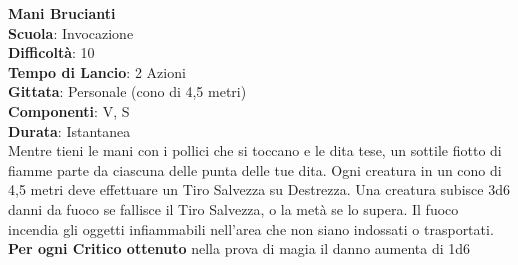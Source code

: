 \begin{multicols}{2}
\medskip\textbf{Mani Brucianti}\\
\textbf{Scuola}: Invocazione\\
\textbf{Difficoltà}:  10\\
\textbf{Tempo di Lancio}: 2 Azioni\\
\textbf{Gittata}: Personale (cono di 4,5 metri)\\
\textbf{Componenti}: V, S\\
\textbf{Durata}: Istantanea\\
Mentre tieni le mani con i pollici che si toccano e le dita tese, un sottile fiotto di fiamme parte da ciascuna delle punta delle tue dita. Ogni creatura in un cono di 4,5 metri deve effettuare un Tiro Salvezza su Destrezza. Una creatura subisce 3d6 danni da fuoco se fallisce il Tiro Salvezza, o la metà se lo supera. Il fuoco incendia gli oggetti infiammabili nell'area che non siano indossati o trasportati.\\
\textbf{Per ogni Critico ottenuto} nella prova di magia il danno aumenta di 1d6


\end{multicols}
